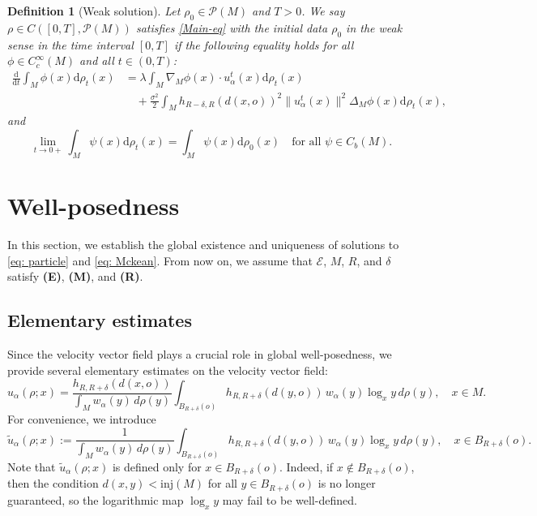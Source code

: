 \documentclass[11pt]{amsart}
\newtheorem{definition}{Definition}[section]
\def\d{\mathrm{d}}
\newcommand{\p}{o}%
\newcommand{\dist}{d}%
\newcommand{\inj}{\mathrm{inj}}%
\begin{document}
\begin{definition}[Weak solution] \label{def:weaksol}
Let $\rho_0\in\mathcal{P}(M)$ and $T>0$. We say $\rho\in C([0, T],\mathcal{P}(M))$ satisfies \eqref{Main-eq} with the initial data $\rho_0$ in the weak sense in the time interval $[0, T]$ if the following equality holds for all $\phi\in {C}_c^\infty(M)$ and all $t\in (0, T)$:
\begin{align*}
\frac{\d}{\d t}\int_M \phi(x)\d\rho_t(x)&=\lambda\int_{M} \nabla_M\phi(x)\cdot u_\alpha^t(x)\d\rho_t(x) \\
&\quad +\frac{\sigma^2}{2}\int_M h_{R-\delta,R}(\dist(x, \p))^2\|u_\alpha^t(x)\|^2\Delta_M\phi(x)\d\rho_t(x),
\end{align*}
and \[
\lim_{t\to 0+}\int_M \psi(x)\d\rho_t(x)=\int_M \psi(x)\d\rho_0(x)
\quad \text{for all } \psi\in C_b(M).
\]
\end{definition}







\section{Well-posedness} \label{sec:3}
\setcounter{equation}{0}

In this section, we establish the global existence and uniqueness of solutions  to \eqref{eq: particle} and \eqref{eq: Mckean}. From now on, we assume that $\mathcal{E}$, $M$, $R$, and $\delta$ satisfy \textbf{(E)}, \textbf{(M)}, and \textbf{(R)}. 

\subsection{Elementary estimates}
Since the velocity vector field plays a crucial role in global well-posedness, we provide several elementary estimates on the velocity vector field:
\[
u_\alpha(\rho;x)=\frac{h_{R,R+\delta}(\dist(x,\p))}{\int_M w_\alpha(y)\,d\rho(y)}
\int_{B_{R+\delta}(\p)} h_{R,R+\delta}(\dist(y,\p))\,w_\alpha(y)\log_x y\,d\rho(y),
\quad x\in M.
\]
For convenience, we   introduce
\[
\tilde{u}_\alpha(\rho;x):=\frac{1}{\int_M w_\alpha(y)\,d\rho(y)}
\int_{B_{R+\delta}(\p)} h_{R,R+\delta}(\dist(y,\p))\,w_\alpha(y)\log_x y\,d\rho(y),
\quad x\in B_{R+\delta}(\p).
\]
Note that $\tilde{u}_\alpha(\rho;x)$ is defined only for $x\in B_{R+\delta}(\p)$. Indeed, if $x\notin B_{R+\delta}(\p)$, then the condition $\dist(x,y)<\inj(M)$ for all $y\in B_{R+\delta}(\p)$ is no longer guaranteed, so the logarithmic map $\log_x y$ may fail to be well-defined. \\
\end{document}
